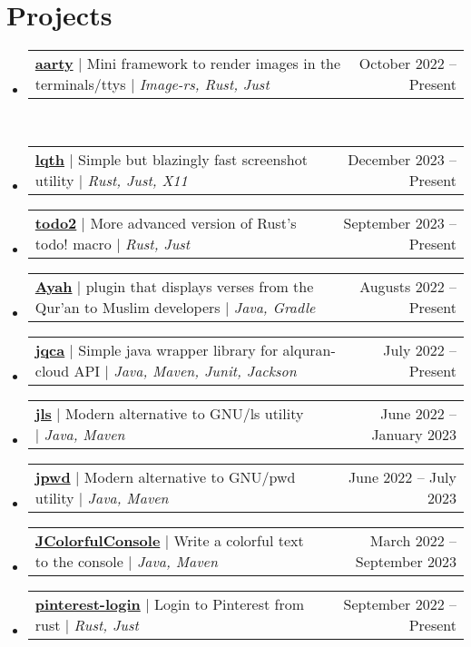 \documentclass[letterpaper,11pt]{article}
\makeatletter
\newcommand{\resumeProjectHeading}[2]{
    \item
    \begin{tabular*}{0.97\textwidth}{l@{\extracolsep{\fill}}r}
      \small#1 & #2 \\
    \end{tabular*}\vspace{-7pt}
}
\newcommand{\resumeSubHeadingListStart}{\begin{itemize}[leftmargin=0.15in, label={}]}
\newcommand{\resumeSubHeadingListEnd}{\end{itemize}}
\makeatother
\begin{document}
\section{Projects}
    \resumeSubHeadingListStart
      \resumeProjectHeading
          {\href{https://github.com/0x61nas/aarty}{\textbf{aarty}} | Mini framework to render images in the terminals/ttys $|$ \emph{Image-rs, Rust, Just}}{October 2022 -- Present} \\
      \resumeProjectHeading
          {\href{https://github.com/0x61nas/lqth}{\textbf{lqth}} | Simple but blazingly fast screenshot utility $|$ \emph{Rust, Just, X11}}{December 2023 -- Present}
      \resumeProjectHeading
          {\href{https://github.com/0x61nas/todo2}{\textbf{todo2}} | More advanced version of Rust's todo! macro $|$ \emph{Rust, Just}}{September 2023 -- Present}
      \resumeProjectHeading
          {\href{https://github.com/0x61nas/Ayah-intellij}{\textbf{Ayah}} | plugin that displays verses from the Qur'an to Muslim developers $|$ \emph{Java, Gradle}}{Augusts 2022 -- Present}
      \resumeProjectHeading
          {\href{https://github.com/0x61nas/alquran-cloud-api}{\textbf{jqca}} | Simple java wrapper library for alquran-cloud API $|$ \emph{Java, Maven, Junit, Jackson}}{July 2022 -- Present}
      \resumeProjectHeading
          {\href{https://github.com/anas-stuff/jls}{\textbf{jls}} | Modern alternative to GNU/ls utility $|$ \emph{Java, Maven}}{June 2022 -- January 2023}
      \resumeProjectHeading
          {\href{https://github.com/0x61nas/jpwd}{\textbf{jpwd}} | Modern alternative to GNU/pwd utility $|$ \emph{Java, Maven}}{June 2022 -- July 2023}
      \resumeProjectHeading
          {\href{https://github.com/0x61nas/JColorfulConsole}{\textbf{JColorfulConsole}} | Write a colorful text to the console $|$ \emph{Java, Maven}}{March 2022 -- September 2023}
      \resumeProjectHeading
          {\href{https://github.com/0x61nas/pinterest-login}{\textbf{pinterest-login}} | Login to Pinterest from rust $|$ \emph{Rust, Just}}{September 2022 -- Present}
    \resumeSubHeadingListEnd


\end{document}
